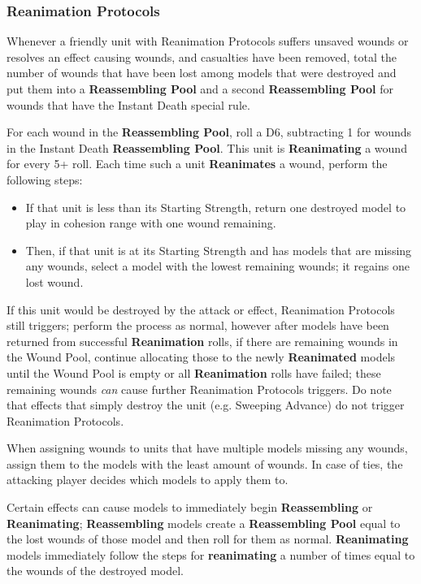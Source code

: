 \begin{multicols}{2}
\subsubsection{Reanimation Protocols} \label{Reanimation Protocols}

Whenever a friendly unit with Reanimation Protocols suffers unsaved wounds or resolves an effect causing wounds, and casualties have been removed, total the number of wounds that have been lost among models that were destroyed and put them into a \textbf{Reassembling Pool} and a second \textbf{Reassembling Pool} for wounds that have the Instant Death special rule.

For each wound in the \textbf{Reassembling Pool}, roll a D6, subtracting 1 for wounds in the Instant Death \textbf{Reassembling Pool}. This unit is \textbf{Reanimating} a wound for every 5+ roll. Each time such a unit \textbf{Reanimates} a wound, perform the following steps:

\begin{itemize}
	\itemsep 0pt
	\item If that unit is less than its Starting Strength, return one destroyed model to play in cohesion range with one wound remaining.
	\item Then, if that unit is at its Starting Strength and has models that are missing any wounds, select a model with the lowest remaining wounds; it regains one lost wound.
\end{itemize}

If this unit would be destroyed by the attack or effect, Reanimation Protocols still triggers; perform the process as normal, however after models have been returned from successful \textbf{Reanimation} rolls, if there are remaining wounds in the Wound Pool, continue allocating those to the newly \textbf{Reanimated} models until the Wound Pool is empty or all \textbf{Reanimation} rolls have failed; these remaining wounds \textit{can} cause further Reanimation Protocols triggers. Do note that effects that simply destroy the unit (e.g. Sweeping Advance) do not trigger Reanimation Protocols.

When assigning wounds to units that have multiple models missing any wounds, assign them to the models with the least amount of wounds. In case of ties, the attacking player decides which models to apply them to.

Certain effects can cause models to immediately begin \textbf{Reassembling} or \textbf{Reanimating}; \textbf{Reassembling} models create a \textbf{Reassembling Pool} equal to the lost wounds of those model and then roll for them as normal. \textbf{Reanimating} models immediately follow the steps for \textbf{reanimating} a number of times equal to the wounds of the destroyed model.


\end{multicols}
